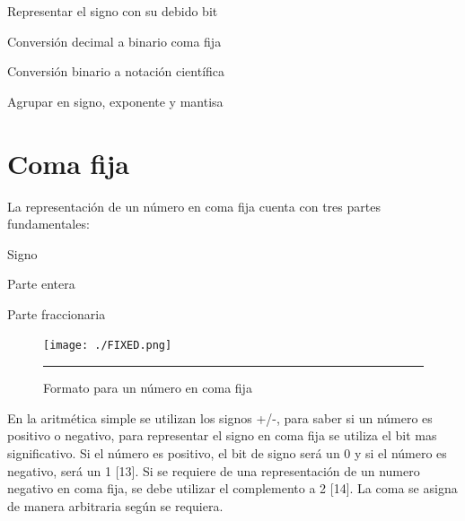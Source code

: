 \begin{compactitem}
\item Representar el signo con su debido bit
\item Conversión decimal a binario coma fija   
\item Conversión binario a notación científica
\item Agrupar en signo, exponente y mantisa 
\end{compactitem}


\section{Coma fija}
 
La representación de un número en coma fija cuenta con tres partes fundamentales:
\begin{compactitem}
\item Signo
\item Parte entera   
\item Parte fraccionaria 
\end{compactitem}

\begin{figure}[H]
  \centering
    \texttt{[image: ./FIXED.png]}
    \rule{35em}{0.5pt}
  \caption[Formato para un número en coma fija]{Formato para un número en coma fija}
  \label{fig:FIXED}
\end{figure}

En la aritmética simple se utilizan los signos +/-, para saber si un número es positivo o negativo, para representar el signo en coma fija se utiliza el bit mas significativo. Si el número es positivo, el bit de signo será un 0 y si el número es negativo, será un 1 [13]. Si se requiere de una representación de un numero negativo en coma fija, se debe utilizar el complemento a 2 [14]. La coma se asigna de manera arbitraria según se requiera.  
 
  
